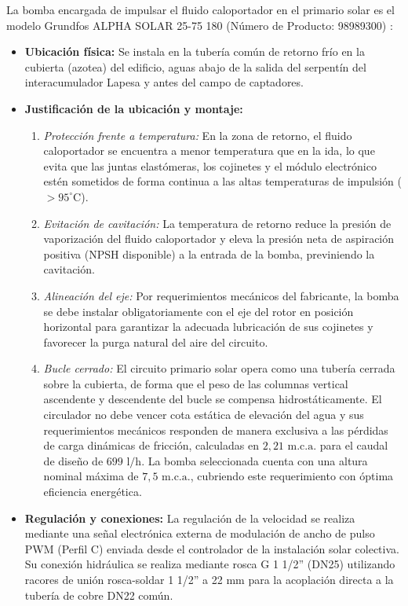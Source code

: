 \documentclass[12pt]{article}
\begin{document}
La bomba encargada de impulsar el fluido caloportador en el primario solar es el modelo Grundfos ALPHA SOLAR 25-75 180 (Número de Producto: 98989300) \cite{grundfos_alpha_solar}:
\begin{itemize}
    \item \textbf{Ubicación física:} Se instala en la tubería común de retorno frío en la cubierta (azotea) del edificio, aguas abajo de la salida del serpentín del interacumulador Lapesa y antes del campo de captadores.
    \item \textbf{Justificación de la ubicación y montaje:}
    \begin{enumerate}
        \item \textit{Protección frente a temperatura:} En la zona de retorno, el fluido caloportador se encuentra a menor temperatura que en la ida, lo que evita que las juntas elastómeras, los cojinetes y el módulo electrónico estén sometidos de forma continua a las altas temperaturas de impulsión ($>95^\circ\text{C}$).
        \item \textit{Evitación de cavitación:} La temperatura de retorno reduce la presión de vaporización del fluido caloportador y eleva la presión neta de aspiración positiva (NPSH disponible) a la entrada de la bomba, previniendo la cavitación.
        \item \textit{Alineación del eje:} Por requerimientos mecánicos del fabricante, la bomba se debe instalar obligatoriamente con el eje del rotor en posición horizontal para garantizar la adecuada lubricación de sus cojinetes y favorecer la purga natural del aire del circuito.
        \item \textit{Bucle cerrado:} El circuito primario solar opera como una tubería cerrada sobre la cubierta, de forma que el peso de las columnas vertical ascendente y descendente del bucle se compensa hidrostáticamente. El circulador no debe vencer cota estática de elevación del agua y sus requerimientos mecánicos responden de manera exclusiva a las pérdidas de carga dinámicas de fricción, calculadas en $2,21\text{ m.c.a.}$ para el caudal de diseño de $699\text{ l/h}$. La bomba seleccionada cuenta con una altura nominal máxima de $7,5\text{ m.c.a.}$, cubriendo este requerimiento con óptima eficiencia energética.
    \end{enumerate}
    \item \textbf{Regulación y conexiones:} La regulación de la velocidad se realiza mediante una señal electrónica externa de modulación de ancho de pulso PWM (Perfil C) enviada desde el controlador de la instalación solar colectiva. Su conexión hidráulica se realiza mediante rosca G 1 1/2'' (DN25) utilizando racores de unión rosca-soldar 1 1/2'' a 22 mm para la acoplación directa a la tubería de cobre DN22 común.
\end{itemize}
\end{document}
